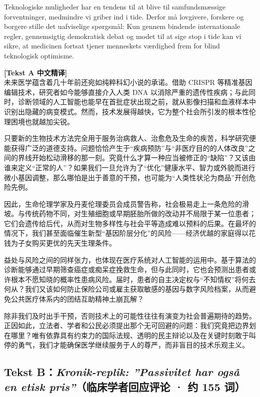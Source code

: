 Teknologiske muligheder har en tendens til at blive til samfundsmæssige forventninger, medmindre vi griber ind i tide. Derfor må lovgivere, forskere og borgere stille det uafviselige spørgsmål:  Kun gennem bindende internationale regler, gennemsigtig demokratisk debat og modet til at sige stop i tide kan vi sikre, at medicinen fortsat tjener menneskets værdighed frem for blind teknologisk optimisme.

\begin{transbox}
\small
\textbf{\color{NCDTeal}[Tekst A 中文精译]}\\
未来医学蕴含着几十年前还宛如纯粹科幻小说的承诺。借助 CRISPR 等精准基因编辑技术，研究者如今能够直接介入人类 DNA 以消除严重的遗传性疾病；与此同时，诊断领域的人工智能也能早在首批症状出现之前，就从影像扫描和血液样本中识别出隐藏的病变模式。然而，技术发展得越快，它为整个社会所引发的根本性伦理困境也就越加尖锐。

只要新的生物技术方法完全用于服务治病救人、治愈危及生命的疾苦，科学研究便能获得广泛的道德支持。问题恰恰产生于“疾病预防”与“非医疗目的的人体改良”之间的界线开始松动滑移的那一刻。究竟什么才算一种应当被修正的“缺陷”？又该由谁来定义“正常的人”？如果我们一旦允许为了“优化”健康水平、智力或外貌而进行微小基因调整，那么哪怕是出于善意的干预，也可能为“人类性状沦为商品”开创危险先例。

因此，生命伦理学家及丹麦伦理委员会成员警告称，社会极易走上一条危险的滑坡。与传统药物不同，对生殖细胞或早期胚胎所做的改动并不局限于某一位患者；它们会遗传给后代，从而对生物多样性与社会平等造成难以预料的后果。在最坏的情况下，我们甚至面临催生新型“基因阶层分化”的风险——经济优越的家庭得以花钱为子女购买更优的先天生理条件。

益处与风险之间的同样张力，也体现在医疗系统对人工智能的运用中。基于算法的诊断能够通过早期筛查癌症或痴呆症挽救生命，但与此同时，它也会预测出患者或许根本不愿知晓的概率性患病风险。届时，患者的自主决定权与“不知情权”将何去何从？我们又该如何防止保险公司或雇主获取敏感的基因与数字风险档案，从而避免公共医疗体系内的团结互助精神土崩瓦解？

除非我们及时出手干预，否则技术上的可能性往往有演变为社会普遍期待的趋势。正因如此，立法者、学者和公民必须提出那个无可回避的问题：我们究竟把边界划在哪里？唯有依靠具有约束力的国际法规、透明的民主辩论以及在关键时刻敢于叫停的勇气，我们才能确保医学继续服务于人的尊严，而非盲目的技术乐观主义。
\end{transbox}

\subsection*{Tekst B：\textit{Kronik-replik: ”Passivitet har også en etisk pris”}（临床学者回应评论 · 约 155 词）}

